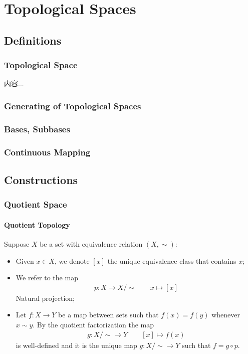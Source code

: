\documentclass[Total.tex]{subfiles}
\begin{document}
	\chapter{Topological Spaces}
		\section{Definitions}
		
			\subsection{Topological Space}
			\begin{Def}
				内容...
			\end{Def}
			\subsection{Generating of Topological Spaces}
			\subsection{Bases, Subbases}
			
			\subsection{Continuous Mapping}
		\section{Constructions}
			\subsection{Quotient Space}
				\subsubsection{Quotient Topology}
				\begin{Def}
					Suppose $X$ be a set with equivalence relation $(X,\sim)$:
					\begin{itemize}
						\item Given $x\in X$, we denote $[x]$ the unique equivalence class that contains $x$;
						\item We refer to the map
						\begin{gather*}
							p:X\rightarrow X/\sim\qquad x\mapsto [x]
						\end{gather*}
						Natural projection;
						\item Let $f:X\rightarrow Y$ be a map between sets such that $f(x)=f(y)$ whenever $x\sim y$. By the quotient factorization the map
						\begin{gather*}
							g:X/\sim\rightarrow Y\qquad [x]\mapsto f(x)
						\end{gather*}
						is well-defined and it is the unique map $g:X/\sim\rightarrow Y$ such that $f=g\circ p$.
					\end{itemize}
				\end{Def}
				
\end{document}
